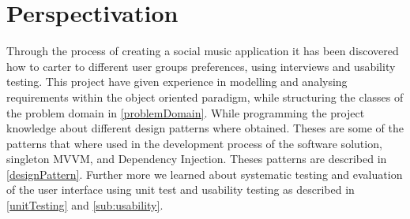 \chapter{Perspectivation}
\label{cha:perspectivation}

Through the process of creating a social music application it has been discovered how to carter to different user groups preferences, using interviews and usability testing. This project have given experience in modelling and analysing requirements within the object oriented paradigm, while structuring the classes of the problem domain in \cref{problemDomain}.
While programming the project knowledge about different design patterns where obtained. Theses are some of the patterns that where used in the development process of the software solution, singleton MVVM, and Dependency Injection. Theses patterns are described in \cref{designPattern}. 
Further more we learned about systematic testing and evaluation of the user interface using unit test and usability testing as described in \cref{unitTesting} and \cref{sub:usability}. 

